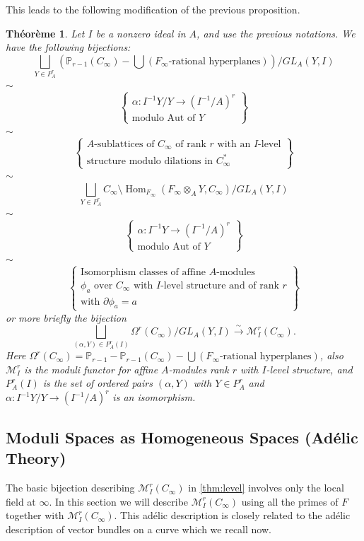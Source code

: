 \documentclass[12pt,a4paper]{article}
\theoremstyle{plain}
\newtheorem{theorem}{Th\'eor\`eme}[section]
\theoremstyle{definition}
\theoremstyle{remark}
\DeclareMathOperator{\Hom}{Hom}
\newcommand{\bP}{\mathbb{P}}
\newcommand{\cM}{\mathcal{M}}
\providecommand{\cM}{\mathcal{M}}
\providecommand{\Hom}{\operatorname{Hom}}
\begin{document}
This leads to the following modification of the previous proposition.

\begin{theorem}
\label{thm:level}
Let $I$ be a nonzero ideal in $A$, and use the previous notations. We have the following bijections:
\[
\bigsqcup_{Y \in P_A^r} (\bP_{r-1}(C_\infty) - \bigcup (F_\infty\text{-rational hyperplanes}))/GL_A(Y, I)
\]
$\sim$
\[
\left\{\begin{array}{c}
\alpha: I^{-1}Y/Y \to (I^{-1}/A)^r \\
\text{modulo Aut of } Y
\end{array}\right\}
\]
$\sim$
\[
\left\{\begin{array}{c}
A\text{-sublattices of } C_\infty \text{ of rank } r \text{ with an } I\text{-level} \\
\text{structure modulo dilations in } C_\infty^*
\end{array}\right\}
\]
$\sim$
\[
\bigsqcup_{Y \in P_A^r} C_\infty \setminus \Hom_{F_\infty}(F_\infty \otimes_A Y, C_\infty)/GL_A(Y, I)
\]
$\sim$
\[
\left\{\begin{array}{c}
\alpha: I^{-1}Y \to (I^{-1}/A)^r \\
\text{modulo Aut of } Y
\end{array}\right\}
\]
$\sim$
\[
\left\{\begin{array}{c}
\text{Isomorphism classes of affine } A\text{-modules} \\
\phi_a \text{ over } C_\infty \text{ with } I\text{-level structure and of rank } r \\
\text{with } \partial \phi_a = a
\end{array}\right\}
\]
or more briefly the bijection
\[
\bigsqcup_{(\alpha, Y) \in P_A^r(I)} \Omega^r(C_\infty)/GL_A(Y, I) \xrightarrow{\sim} \cM_I^r(C_\infty).
\]
Here $\Omega^r(C_\infty) = \bP_{r-1} - \bP_{r-1}(C_\infty) - \bigcup (F_\infty\text{-rational hyperplanes})$, also $\cM_I^r$ is the moduli functor for affine $A$-modules rank $r$ with $I$-level structure, and $P_A^r(I)$ is the set of ordered pairs $(\alpha, Y)$ with $Y \in P_A^r$ and $\alpha: I^{-1}Y/Y \to (I^{-1}/A)^r$ is an isomorphism.
\end{theorem}

\subsection{Moduli Spaces as Homogeneous Spaces (Ad\'elic Theory)}
\label{sec:adelic}

The basic bijection describing $\cM_I^r(C_\infty)$ in \eqref{thm:level} involves only the local field at $\infty$. In this section we will describe $\cM_I^r(C_\infty)$ using all the primes of $F$ together with $\cM_I^r(C_\infty)$. This ad\'elic description is closely related to the ad\'elic description of vector bundles on a curve which we recall now.
\end{document}
